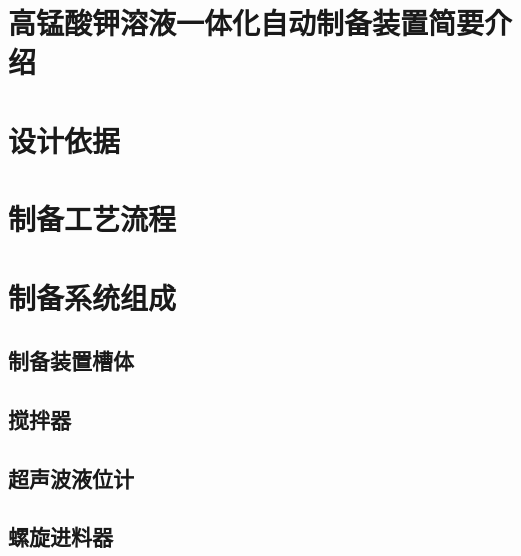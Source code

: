 \documentclass[UTF8,a4paper,12pt,titlepage]{ctexart}
\begin{document}


\tableofcontents %

\newpage %


\section{高锰酸钾溶液一体化自动制备装置简要介绍}


\section{设计依据}

\newpage

\section{制备工艺流程}


\section{制备系统组成}
    \subsection{制备装置槽体}
    
    \newpage

    \subsection{搅拌器}
    

    \subsection{超声波液位计}
    
    
    \subsection{螺旋进料器}
    
    
\end{document}
